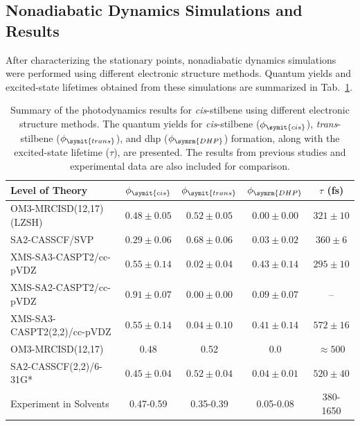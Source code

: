 \subsection{Nonadiabatic Dynamics Simulations and Results}
After characterizing the stationary points, nonadiabatic dynamics simulations were performed using different electronic structure methods. Quantum yields and excited-state lifetimes obtained from these simulations are summarized in Tab.~\ref{tab:sensitivity_analysis_results}.
\begin{table}[H]
\centering
\caption{Summary of the photodynamics results for \textit{cis}-stilbene using different electronic structure methods. The quantum yields for \textit{cis}-stilbene ($\phi_{\symit{cis}}$), \textit{trans}-stilbene ($\phi_{\symit{trans}}$), and \acrshort{dhp} ($\phi_{\symrm{DHP}}$) formation, along with the excited-state lifetime ($\tau$), are presented. The results from previous studies and experimental data are also included for comparison.}
    \label{tab:sensitivity_analysis_results}
    \begin{tabular}{lcccc}
        \hline
        Level of Theory&$\phi_{\symit{cis}}$&$\phi_{\symit{trans}}$&$\phi_{\symrm{DHP}}$&$\tau$ (fs)\\
        \hline
        OM3-MRCISD(12,17) (LZSH)& $0.48\pm0.05$&$0.52\pm0.05$&$0.00\pm0.00$ &$321\pm10$\\
        SA2-CASSCF/SVP&$0.29\pm0.06$&$0.68\pm0.06$&$0.03\pm0.02$&$360\pm6$\\
        XMS-SA3-CASPT2/cc-pVDZ&$0.55\pm0.14$&$0.02\pm0.04$&$0.43\pm0.14$&$295\pm10$\\
        XMS-SA2-CASPT2/cc-pVDZ&$0.91\pm0.07$&$0.00\pm0.00$&$0.09\pm0.07$&--\\
        \hline
        XMS-SA3-CASPT2(2,2)/cc-pVDZ\supercite{10.1021/jacs.2c12266}&$0.55\pm0.14$&$0.04\pm0.10$&$0.41\pm0.14$& $572\pm16$\\
        OM3-MRCISD(12,17)\supercite{10.1038/s41557-022-01012-0}&0.48&0.52&0.0&$\approx500$\\
        SA2-CASSCF(2,2)/6-31G*\supercite{10.1021/acs.jpcb.0c03344}&$0.45\pm0.04$&$0.52\pm0.04$&$0.04\pm0.01$&$520\pm40$\\
        \hline
        Experiment in Solvents\supercite{10.1021/ja00076a041,10.1021/acs.jpca.8b04011}&0.47-0.59&0.35-0.39&0.05-0.08&380-1650\\
        \hline
    \end{tabular}
\end{table}
